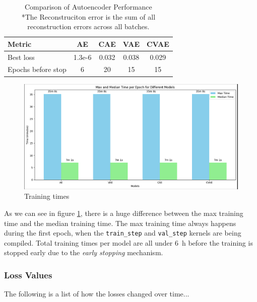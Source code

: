 \begin{table}[!htbp]
    \centering
    \begin{tabular}{lcccc}
        \hline
        \textbf{Metric} & \textbf{AE} & \textbf{CAE} & \textbf{VAE} & \textbf{CVAE} \\
        \hline
        Best loss & 1.3e-6 & 0.032 & 0.038 & 0.029 \\
        Epochs before stop & 6 & 20 & 15 & 15 \\
        \hline
    \end{tabular}
    \caption{Comparison of Autoencoder Performance\\ *The Reconstruciton error is the sum of all reconstruction errors across all batches.}
    \label{tab:autoencoder_comparison}
\end{table}

\begin{figure}[!h]
    \centering
    \includegraphics[scale=0.4]{figures/time.png}
    \caption{Training times}
    \label{fig:traintimes}
\end{figure}

As we can see in figure \ref{fig:traintimes}, there is a huge difference between the max training time and the median training time. The max training time always happens during the first epoch, when the \texttt{train\_step} and \texttt{val\_step} kernels are being compiled. Total training times per model are all under \qty{6}{\si{\hour}} before the training is stopped early due to the \textit{early stopping} mechanism.

\subsubsection{Loss Values}

The following is a list of how the losses changed over time...


